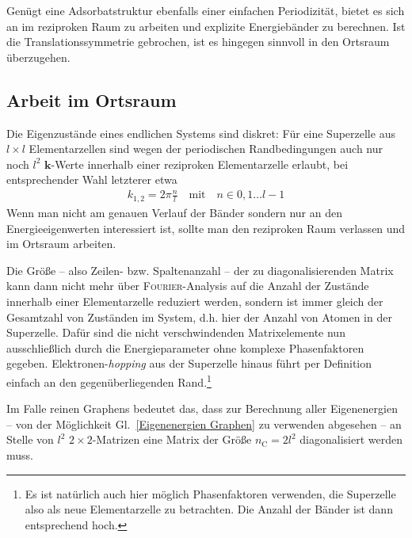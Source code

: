 \documentclass[a4paper, 10pt, twoside, openany]{book} %
\def \vec {\boldsymbol}
\def \nC {n_\mathrm{C}}
\begin{document}
Genügt eine Adsorbatstruktur ebenfalls einer einfachen Periodizität, bietet es sich an im reziproken Raum zu arbeiten und explizite Energiebänder zu berechnen. Ist die Translationssymmetrie gebrochen, ist es hingegen sinnvoll in den Ortsraum überzugehen.

\subsection{Arbeit im Ortsraum}

Die Eigenzustände eines endlichen Systems sind diskret: Für eine Superzelle aus $l \times l$ Elementarzellen sind wegen der periodischen Randbedingungen auch nur noch $l^2$ $\vec k$-Werte innerhalb einer reziproken Elementarzelle erlaubt, bei entsprechender Wahl letzterer etwa
%
\begin{align*}
    k_{1, 2} = 2 \pi \frac n l \quad \text{mit} \quad n \in { 0, 1 \dots l - 1 }
\end{align*}
%
Wenn man nicht am genauen Verlauf der Bänder sondern nur an den Energieeigenwerten interessiert ist, sollte man den reziproken Raum verlassen und im Ortsraum arbeiten.

Die Größe -- also Zeilen- bzw. Spaltenanzahl -- der zu diagonalisierenden Matrix kann dann nicht mehr über \textsc{Fourier}-Analysis auf die Anzahl der Zustände innerhalb einer Elementarzelle reduziert werden, sondern ist immer gleich der Gesamtzahl von Zuständen im System, d.h. hier der Anzahl von Atomen in der Superzelle. Dafür sind die nicht verschwindenden Matrixelemente nun ausschließlich durch die Energieparameter ohne komplexe Phasenfaktoren gegeben. Elektronen-\emph{hopping} aus der Superzelle hinaus führt per Definition einfach an den gegenüberliegenden Rand.\footnote{Es ist natürlich auch hier möglich Phasenfaktoren verwenden, die Superzelle also als neue Elementarzelle zu betrachten. Die Anzahl der Bänder ist dann entsprechend hoch.}

Im Falle reinen Graphens bedeutet das, dass zur Berechnung aller Eigenenergien -- von der Möglichkeit Gl.~\ref{Eigenenergien Graphen} zu verwenden abgesehen -- an Stelle von $l^2$ $2 \times 2$-Matrizen eine Matrix der Größe $\nC = 2 l^2$ diagonalisiert werden muss.
\end{document}
